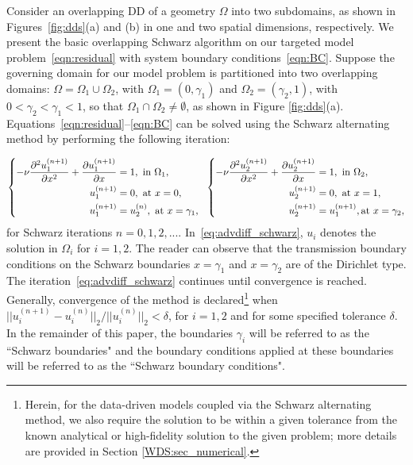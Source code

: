 \documentclass[oneside,final]{csri23}
\begin{document}
Consider 
an overlapping DD of a geometry $\Omega$ into two subdomains, as shown in Figures~\ref{fig:dds}(a) and (b) in one and two spatial dimensions, respectively. We present the basic overlapping Schwarz algorithm on our targeted model problem~\eqref{eqn:residual} with system boundary conditions~\eqref{eqn:BC}.  Suppose the governing domain for our model problem is partitioned into two overlapping domains: $\Omega = \Omega_1 \cup \Omega_2$, with $\Omega_1 = (0,\gamma_1)$ and $\Omega_2 = (\gamma_2, 1)$, with $0 < \gamma_2 < \gamma_1 < 1$, so that $\Omega_1 \cap \Omega_2 \neq \emptyset$, as shown in Figure \ref{fig:dds}(a). Equations~\eqref{eqn:residual}--\eqref{eqn:BC} can be solved using the Schwarz alternating method by performing the following iteration:

\begin{equation}\label{eq:advdiff_schwarz}
    \left\{
    \begin{aligned}
	    -\nu \frac{\partial^2 u_1^{(n+1)}}{\partial x^2} + \frac{\partial u_1^{(n+1)}}{\partial x}  & = 1, \text{ in } \Omega_1,
        \\
        u_1^{(n+1)} & = 0,  \text{ at } x = 0,
        \\
        u_1^{(n+1)} & = u_2^{(n)},  \text{ at }  x=\gamma_1,
        \\
    \end{aligned}
    \right. \hspace{0.2cm}
    \left\{
    \begin{aligned}
	    -\nu \frac{\partial^2 u_2^{(n+1)}}{\partial x^2} + \frac{\partial u_2^{(n+1)}}{\partial x}  & = 1, \text{ in } \Omega_2,
        \\
        u_2^{(n+1)} & = 0,  \text{ at } x = 1,
        \\
        u_2^{(n+1)} & = u_1^{(n+1)},  \text{at }  x = \gamma_2, 
        \\
    \end{aligned} \right.
\end{equation}
for Schwarz iterations $n = 0, 1, 2, ...$.  In~\eqref{eq:advdiff_schwarz}, $u_i$ denotes the solution in $\Omega_i$ for $i=1,2$.  The reader can observe that the transmission boundary conditions on the Schwarz boundaries $x = \gamma_1$ and $x = \gamma_2$ are of the Dirichlet type. The iteration~\eqref{eq:advdiff_schwarz} continues until convergence is reached. Generally, convergence of the method is declared\footnote{Herein, for the data-driven models coupled via the Schwarz alternating method, 
we also require the solution to be within a given tolerance from the known analytical or high-fidelity solution to the given problem; more details are provided in Section \ref{WDS:sec_numerical}.} when $||u_i^{(n+1)} - u_i^{(n)}||_2/||u_i^{(n)}||_2 < \delta$, for $i=1,2$ and for some specified tolerance $\delta$. In the remainder of this paper, the boundaries $\gamma_i$ will be referred to as the ``Schwarz boundaries" and the boundary conditions applied at these boundaries will be referred to as the ``Schwarz boundary conditions".  
\end{document}
